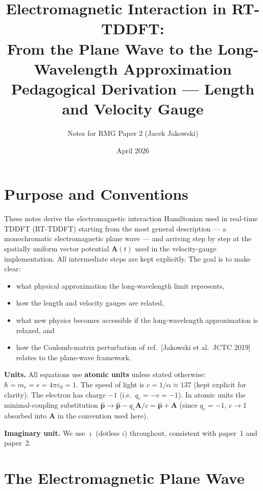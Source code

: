 \documentclass[11pt]{article}
\title{%
  Electromagnetic Interaction in RT-TDDFT:\\
  From the Plane Wave to the Long-Wavelength Approximation\\[4pt]
  {\large Pedagogical Derivation — Length and Velocity Gauge}%
}
\author{Notes for RMG Paper 2 (Jacek Jakowski)}
\date{April 2026}
\newcommand{\iunit}{\imath}          %
\newcommand{\Avec}{\mathbf{A}}
\begin{document}
\maketitle
\tableofcontents
\newpage

\section{Purpose and Conventions}

These notes derive the electromagnetic interaction Hamiltonian
used in real-time TDDFT (RT-TDDFT) starting from the most general
description --- a monochromatic electromagnetic plane wave ---
and arriving step by step at the spatially uniform vector potential
$\Avec(t)$ used in the velocity-gauge implementation.
All intermediate steps are kept explicitly.
The goal is to make clear:
\begin{itemize}
  \item[(1)] what physical approximation the long-wavelength limit
    represents,
  \item[(2)] how the length and velocity gauges are related,
  \item[(3)] what new physics becomes accessible if the
    long-wavelength approximation is relaxed, and
  \item[(4)] how the Coulomb-matrix perturbation of
    ref.~[Jakowski et al.\ JCTC 2019] relates to the plane-wave
    framework.
\end{itemize}

\noindent\textbf{Units.}
All equations use \textbf{atomic units} unless stated otherwise:
$\hbar=m_e=e=4\pi\varepsilon_0=1$.
The speed of light is $c=1/\alpha\approx137$ (kept explicit for
clarity).
The electron has charge $-1$ (i.e.\ $q_e = -e = -1$).
In atomic units the minimal-coupling substitution
$\hat{\mathbf{p}}\to\hat{\mathbf{p}}-q_e\Avec/c
= \hat{\mathbf{p}}+\Avec$ (since $q_e=-1$, $c\to1$ absorbed into
$\Avec$ in the convention used here).

\noindent\textbf{Imaginary unit.}
We use $\iunit$ (dotless $i$) throughout, consistent with paper~1
and paper~2.

\section{The Electromagnetic Plane Wave}
\end{document}

